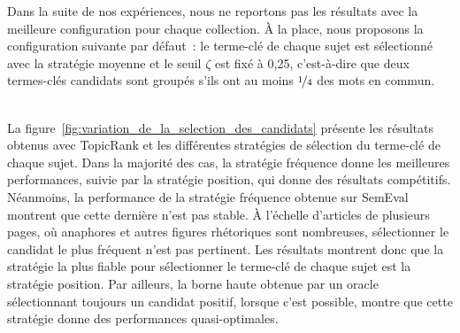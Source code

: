         Dans la suite de nos expériences, nous ne reportons pas les résultats
        avec la meilleure configuration pour chaque collection. À la place, nous
        proposons la configuration suivante par défaut~: le terme-clé de chaque
        sujet est sélectionné avec la stratégie moyenne et le seuil $\zeta$ est
        fixé à 0,25, c'est-à-dire que deux termes-clés candidats sont groupés
        s'ils ont au moins $\unitfrac{1}{4}$ des mots en commun.

        ~\\La figure~\ref{fig:variation_de_la_selection_des_candidats} présente
        les résultats obtenus avec TopicRank et les différentes stratégies de
        sélection du terme-clé de chaque sujet. Dans la majorité des cas, la
        stratégie fréquence donne les meilleures performances, suivie par la
        stratégie position, qui donne des résultats compétitifs. Néanmoins, la
        performance de la stratégie fréquence obtenue sur SemEval montrent que
        cette dernière n'est pas stable. À l'échelle d'articles de
        plusieurs pages, où anaphores et autres figures
        rhétoriques sont nombreuses, sélectionner le candidat le plus fréquent
        n'est pas pertinent. Les résultats montrent donc que la stratégie la
        plus fiable pour sélectionner le terme-clé de chaque sujet est la
        stratégie position. Par ailleurs, la borne haute obtenue par un oracle
        sélectionnant toujours un candidat positif, lorsque c'est possible, 
        montre que cette stratégie donne des performances quasi-optimales.
